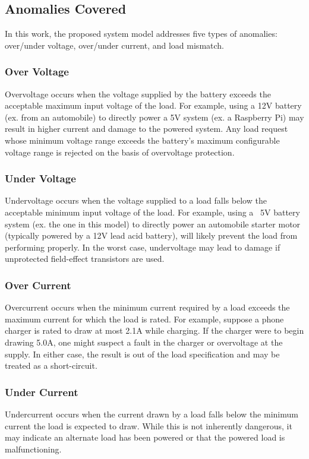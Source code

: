 \documentclass[11pt,conference,draftcls,onecolumn]{IEEEtran}
\begin{document}
\subsection{Anomalies Covered}
In this work, the proposed system model addresses five types of anomalies: over/under voltage, over/under current, and load mismatch.

\subsubsection{Over Voltage}
Overvoltage occurs when the voltage supplied by the battery exceeds the acceptable maximum input voltage of the load.
For example, using a 12V battery (ex. from an automobile) to directly power a 5V system (ex. a Raspberry Pi) may result in higher current and damage to the powered system.
Any load request whose minimum voltage range exceeds the battery's maximum configurable voltage range is rejected on the basis of overvoltage protection.

\subsubsection{Under Voltage}
Undervoltage occurs when the voltage supplied to a load falls below the acceptable minimum input voltage of the load.
For example, using a ~5V battery system (ex. the one in this model) to directly power an automobile starter motor (typically powered by a 12V lead acid battery), will likely prevent the load from performing properly.
In the worst case, undervoltage may lead to damage if unprotected field-effect transistors are used.

\subsubsection{Over Current}
Overcurrent occurs when the minimum current required by a load exceeds the maximum current for which the load is rated.
For example, suppose a phone charger is rated to draw at most 2.1A while charging.
If the charger were to begin drawing 5.0A, one might suspect a fault in the charger or overvoltage at the supply.
In either case, the result is out of the load specification and may be treated as a short-circuit.

\subsubsection{Under Current}
Undercurrent occurs when the current drawn by a load falls below the minimum current the load is expected to draw.
While this is not inherently dangerous, it may indicate an alternate load has been powered or that the powered load is malfunctioning.
\end{document}

